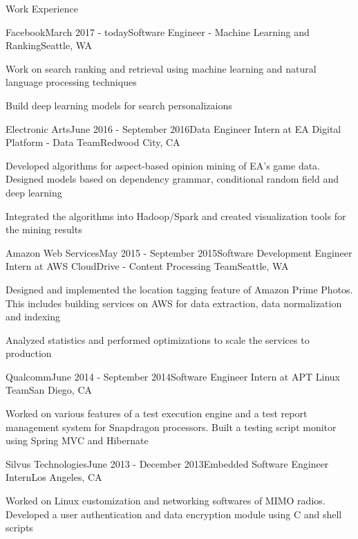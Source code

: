 \documentclass{resume} %
\begin{document}
\begin{rSection}{Work Experience}

\begin{rSubsection}{Facebook}{March 2017 - today}{Software Engineer - Machine Learning and Ranking}{Seattle, WA}
\item Work on search ranking and retrieval using machine learning and natural language processing techniques
\item Build deep learning models for search personalizaions
\end{rSubsection}


\begin{rSubsection}{Electronic Arts}{June 2016 - September 2016}{Data Engineer Intern at EA Digital Platform - Data Team}{Redwood City, CA}
\item Developed algorithms for aspect-based opinion mining of EA's game data. Designed models based on dependency grammar, conditional random field and deep learning
\item Integrated the algorithms into Hadoop/Spark and created visualization tools for the mining results
\end{rSubsection}



\begin{rSubsection}{Amazon Web Services}{May 2015 - September 2015}{Software Development Engineer Intern at AWS CloudDrive - Content Processing Team}{Seattle, WA}
\item Designed and implemented the location tagging feature of Amazon Prime Photos. This includes building services on AWS for data extraction, data normalization and indexing
\item Analyzed statistics and performed optimizations to scale the services to production
\end{rSubsection}


\begin{rSubsection}{Qualcomm}{June 2014 - September 2014}{Software Engineer Intern at APT Linux Team}{San Diego, CA}
\item Worked on various features of a test execution engine and a test report management system for Snapdragon processors. Built a testing script monitor using Spring MVC and Hibernate
\end{rSubsection}


\begin{rSubsection}{Silvus Technologies}{June 2013 - December 2013}{Embedded Software Engineer Intern}{Los Angeles, CA}
\item Worked on Linux customization and networking softwares of MIMO radios. Developed a user authentication and data encryption module using C and shell scripts
\end{rSubsection}

\end{rSection}
\end{document}
